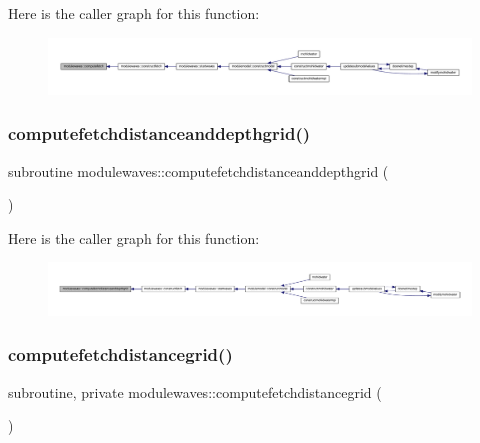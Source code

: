 Here is the caller graph for this function\+:\nopagebreak
\begin{figure}[H]
\begin{center}
\leavevmode
\includegraphics[width=350pt]{namespacemodulewaves_a1ef67144876afbf33cc3bff9a3c88ebd_icgraph}
\end{center}
\end{figure}
\mbox{\label{namespacemodulewaves_a885bbbf547ce705b1cd35ecfebe8df37}} 
\subsubsection{\texorpdfstring{computefetchdistanceanddepthgrid()}{computefetchdistanceanddepthgrid()}}
{\footnotesize\ttfamily subroutine modulewaves\+::computefetchdistanceanddepthgrid (\begin{DoxyParamCaption}{ }\end{DoxyParamCaption})\hspace{0.3cm}{\ttfamily [private]}}

Here is the caller graph for this function\+:\nopagebreak
\begin{figure}[H]
\begin{center}
\leavevmode
\includegraphics[width=350pt]{namespacemodulewaves_a885bbbf547ce705b1cd35ecfebe8df37_icgraph}
\end{center}
\end{figure}
\mbox{\label{namespacemodulewaves_a945cce4a681b204911670731bf66725a}} 
\subsubsection{\texorpdfstring{computefetchdistancegrid()}{computefetchdistancegrid()}}
{\footnotesize\ttfamily subroutine, private modulewaves\+::computefetchdistancegrid (\begin{DoxyParamCaption}{ }\end{DoxyParamCaption})\hspace{0.3cm}{\ttfamily [private]}}

